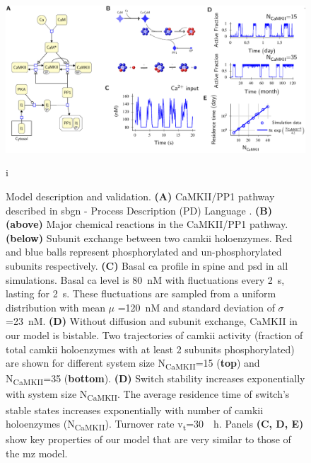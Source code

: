 \documentclass[9pt,lineno,doublespacing]{elife}
\newcommand\SUB[2]{#1\textsubscript{#2}}
\begin{document}
\begin{figure}[t]%
    \includegraphics[width=0.95\linewidth]{./PaperFigures/elifeFigure1/figure_validation_178mm.pdf}
    \caption{Model description and validation. \textbf{(A)} CaMKII/PP1
        pathway described in \gls{sbgn} - Process Description (PD) Language \citep{novere_systems_2009}. 
        \textbf{(B)} \textbf{(above)} Major chemical reactions in the CaMKII/PP1 pathway. 
        \textbf{(below)} Subunit exchange between two \gls{camkii} holoenzymes. Red
        and blue balls represent phosphorylated and un-phosphorylated subunits
        respectively.  \textbf{(C)} Basal \gls{ca} profile in spine and
        \gls{psd} in all simulations. Basal \gls{ca} level is \SI{80}{\nano M} with fluctuations
        every \SI{2}{\second}, lasting for \SI{2}{\second}. These fluctuations are sampled from a uniform
        distribution with mean $\mu$ =\SI{120}{\nano M} and
        standard deviation of $\sigma$=\SI{23}{\nano M}.
        \textbf{(D)} Without diffusion and subunit exchange, CaMKII in our model is bistable.
        Two trajectories of \gls{camkii} activity (fraction of total \gls{camkii}
        holoenzymes with at least 2 subunits phosphorylated) are shown for different system
        size \SUB{N}{CaMKII}=15 (\textbf{top}) and \SUB{N}{CaMKII}=35 (\textbf{bottom}).
        \textbf{(D)} Switch stability increases exponentially with system size \SUB{N}{CaMKII}. The 
        average residence time of  switch's stable states increases exponentially
        with number of \gls{camkii} holoenzymes (\SUB{N}{CaMKII}). Turnover
        rate \SUB{v}{t}=\SI{30}{\per \hour}. Panels \textbf{(C, D, E)} show key
        properties of our model that are very similar to those of the \gls{mz} 
    model.}\label{fig:validation} i
\end{figure}
\end{document}
